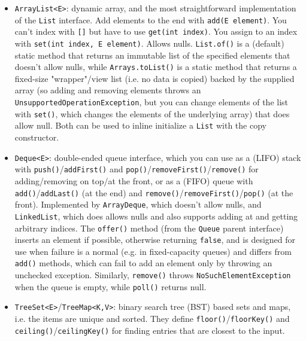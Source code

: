 \documentclass[table, xcdraw]{article}%
\begin{document}
\begin{itemize}
    \item \texttt{ArrayList<E>}: dynamic array, and the most straightforward implementation of the \texttt{List} interface. Add elements to the end with \texttt{add(E element)}. You can't index with \texttt{[]} but have to use \texttt{get(int index)}. You assign to an index with \texttt{set(int index, E element)}. Allows nulls. \texttt{List.of()} is a (default) static method that returns an immutable list of the specified elements that doesn't allow nulls, while \texttt{Arrays.toList()} is a static method that returns a fixed-size "wrapper"/view list (i.e. no data is copied) backed by the supplied array (so adding and removing elements throws an \texttt{UnsupportedOperationException}, but you can change elements of the list with \texttt{set()}, which changes the elements of the underlying array) that does allow null. Both can be used to inline initialize a \texttt{List} with the copy constructor.
    \item \texttt{Deque<E>}: double-ended queue interface, which you can use as a (LIFO) stack with \texttt{push()}/\texttt{addFirst()} and \texttt{pop()}/\texttt{removeFirst()}/\texttt{remove()} for adding/removing on top/at the front, or as a (FIFO) queue with \texttt{add()}/\texttt{addLast()} (at the end) and \texttt{remove()}/\texttt{removeFirst()}/\texttt{pop()} (at the front). Implemented by \texttt{ArrayDeque}, which doesn't allow nulls, and \texttt{LinkedList}, which does allows nulls and also supports adding at and getting arbitrary indices. The \texttt{offer()} method (from the \texttt{Queue} parent interface) inserts an element if possible, otherwise returning \texttt{false}, and is designed for use when failure is a normal (e.g. in fixed-capacity queues) and differs from \texttt{add()} methods, which can fail to add an element only by throwing an unchecked exception. Similarly, \texttt{remove()} throws \texttt{NoSuchElementException} when the queue is empty, while \texttt{poll()} returns null.
    \item \texttt{TreeSet<E>}/\texttt{TreeMap<K,V>}: binary search tree (BST) based sets and maps, i.e. the items are unique and sorted. They define \texttt{floor()}/\texttt{floorKey()} and \texttt{ceiling()}/\texttt{ceilingKey()} for finding entries that are closest to the input.

\end{itemize}
\end{document}
